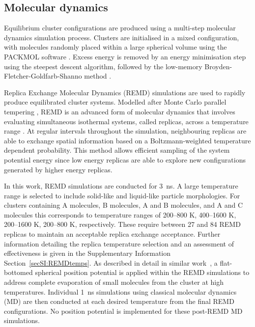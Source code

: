 \subsection{Molecular dynamics}
Equilibrium cluster configurations are produced using a multi-step molecular dynamics simulation process. Clusters are initialised in a mixed configuration, with molecules randomly placed within a large spherical volume using the PACKMOL software \cite{Martinez2009PACKMOL}. Excess energy is removed by an energy minimisation step using the steepest descent algorithm, followed by the low-memory Broyden-Fletcher-Goldfarb-Shanno method \cite{L-BFGS}.

Replica Exchange Molecular Dynamics (REMD) simulations are used to rapidly produce equilibrated cluster systems. Modelled after Monte Carlo parallel tempering \cite{Hukushima1996}, REMD is an advanced form of molecular dynamics that involves evaluating simultaneous isothermal systems, called replicas, across a temperature range \cite{Sugita1999}. At regular intervals throughout the simulation, neighbouring replicas are able to exchange spatial information based on a Boltzmann-weighted temperature dependent probability. This method allows efficient sampling of the system potential energy since low energy replicas are able to explore new configurations generated by higher energy replicas. 

In this work, REMD simulations are conducted for 3~ns. A large temperature range is selected to include solid-like and liquid-like particle morphologies. For clusters containing A molecules, B molecules, A and B molecules, and A and C molecules this corresponds to temperature ranges of 200--800 K, 400--1600 K, 200--1600 K, 200--800 K, respectively. These require between 27 and 84 REMD replicas to maintain an acceptable replica exchange acceptance. Further information detailing the replica temperature selection and an assessment of effectiveness is given in the Supplementary Information Section~\ref{secSI:REMDtemps}. As described in detail in similar work~\cite{bowal2018partitioning}, a flat-bottomed spherical position potential is applied within the REMD simulations to address complete evaporation of small molecules from the cluster at high temperatures. Individual 1~ns simulations using classical molecular dynamics (MD) are then conducted at each desired temperature from the final REMD configurations. No position potential is implemented for these post-REMD MD simulations.

